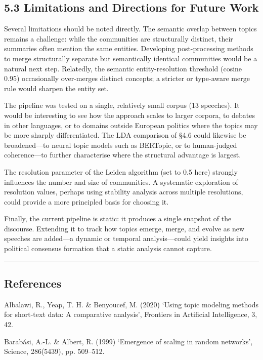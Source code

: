 \documentclass[11pt]{article}
\begin{document}
\subsection{5.3 Limitations and Directions for Future Work}

Several limitations should be noted directly. The semantic overlap between topics remains a challenge: while the communities are structurally distinct, their summaries often mention the same entities. Developing post-processing methods to merge structurally separate but semantically identical communities would be a natural next step. Relatedly, the semantic entity-resolution threshold (cosine 0.95) occasionally over-merges distinct concepts; a stricter or type-aware merge rule would sharpen the entity set.

The pipeline was tested on a single, relatively small corpus (13 speeches). It would be interesting to see how the approach scales to larger corpora, to debates in other languages, or to domains outside European politics where the topics may be more sharply differentiated. The LDA comparison of \S4.6 could likewise be broadened---to neural topic models such as BERTopic, or to human-judged coherence---to further characterise where the structural advantage is largest.

The resolution parameter of the Leiden algorithm (set to 0.5 here) strongly influences the number and size of communities. A systematic exploration of resolution values, perhaps using stability analysis across multiple resolutions, could provide a more principled basis for choosing it.

Finally, the current pipeline is static: it produces a single snapshot of the discourse. Extending it to track how topics emerge, merge, and evolve as new speeches are added---a dynamic or temporal analysis---could yield insights into political consensus formation that a static analysis cannot capture.

\hrule

\subsection*{References}

Albalawi, R., Yeap, T. H. \& Benyoucef, M. (2020) `Using topic modeling methods for short-text data: A comparative analysis', Frontiers in Artificial Intelligence, 3, 42.

Barab\'{a}si, A.-L. \& Albert, R. (1999) `Emergence of scaling in random networks', Science, 286(5439), pp. 509--512.
\end{document}
